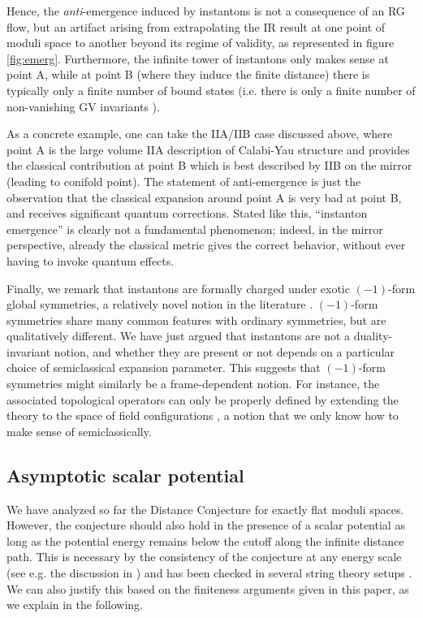 \documentclass[11pt]{article}
\numberwithin{equation}{section}
\numberwithin{equation}{section}
\theoremstyle{remark}
\begin{document}
Hence, the \emph{anti}-emergence induced by instantons is not a consequence of an RG flow, but an artifact arising from extrapolating the IR result at one point of moduli space to another beyond its regime of validity, as represented in figure \ref{fig:emerg}. Furthermore, the infinite tower of instantons only makes sense at point A, while at point B (where they induce the finite distance) there is typically only a finite number of bound states (i.e. there is only a finite number of non-vanishing GV invariants \cite{Gopakumar:1998ii,Gopakumar:1998ki,Gopakumar:1998jq}).

As a concrete example, one can take the IIA/IIB case discussed above, where point A is the large volume IIA description of Calabi-Yau structure and provides the classical contribution at point B which is best described by IIB on the mirror (leading to conifold point). The statement of anti-emergence is just the observation that the classical expansion around point A is very bad at point B, and receives significant quantum corrections. Stated like this, ``instanton emergence'' is clearly not a fundamental phenomenon; indeed, in the mirror perspective, already the classical metric gives the correct behavior, without ever having to invoke quantum effects.

Finally, we remark that instantons are formally charged under exotic $(-1)$-form global symmetries, a relatively novel notion in the literature \cite{Cordova:2019jnf,McNamara:2020uza,Tanizaki:2019rbk,Heidenreich:2020pkc}. $(-1)$-form symmetries share many common features with ordinary symmetries, but are qualitatively different. We have just argued that instantons are not a duality-invariant notion, and whether they are present or not depends on a particular choice of semiclassical expansion parameter. This suggests that $(-1)$-form symmetries might similarly be a frame-dependent notion. For instance, the associated topological operators can only be properly defined by extending the theory to the space of field configurations \cite{Heidenreich:2020pkc}, a notion that we only know how to make sense of semiclassically. 


\subsection{Asymptotic scalar potential}
 

We have analyzed so far the Distance Conjecture for exactly flat moduli spaces. However, the conjecture should also hold in the presence of a scalar potential as long as the potential energy remains below the cutoff along the infinite distance path. This is necessary by the consistency of the conjecture at any energy scale (see e.g. the discussion in \cite{Calderon-Infante:2020dhm}) and has been checked in several string theory setups \cite{Baume:2016psm,Valenzuela:2016yny,Grimm:2019ixq}. We can also justify this based on the finiteness arguments given in this paper, as we explain in the following.
\end{document}
